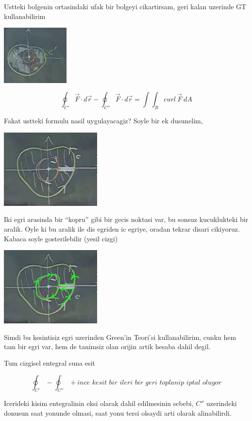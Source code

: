 \documentclass[12pt,fleqn]{article}\usepackage{../common}
\begin{document}
Ustteki bolgenin ortasindaki ufak bir bolgeyi cikartirsam, geri kalan
uzerinde GT kullanabilirim

\includegraphics[height=3cm]{24_4.png}


\[ \oint_{C'} \vec{F} \cdot d\vec{r} - 
\oint_{C''} \vec{F} \cdot d\vec{r}  =
\int \int_R curl \ \vec{F} \ dA 
\]
 
Fakat ustteki formulu nasil uygulayacagiz? Soyle bir ek dusunelim, 

\includegraphics[height=4cm]{24_5.png}

Iki egri arasinda bir ``kopru'' gibi bir gecis noktasi var, bu sonsuz
kucuklukteki bir aralik. Oyle ki bu aralik ile dis egriden ic egriye,
oradan tekrar disari cikiyoruz. Kabaca soyle gosterilebilir (yesil cizgi)

\includegraphics[height=4cm]{24_6.png}

Simdi bu kesintisiz egri uzerinden Green'in Teori'si kullanabilirim, cunku
hem tam bir egri var, hem de tanimsiz olan orijin artik hesaba dahil
degil. 

Tum cizgisel entegral suna esit 

\[ \oint_{C'} - \oint_{C''} + \textit{ince kesit bir ileri bir geri
  toplanip iptal oluyor} \] 

Icerideki kisim entegralinin eksi olarak dahil edilmesinin sebebi, $C''$
uzerindeki donusun saat yonunde olmasi, saat yonu tersi olsaydi arti olarak
alinabilirdi. 
\end{document}
